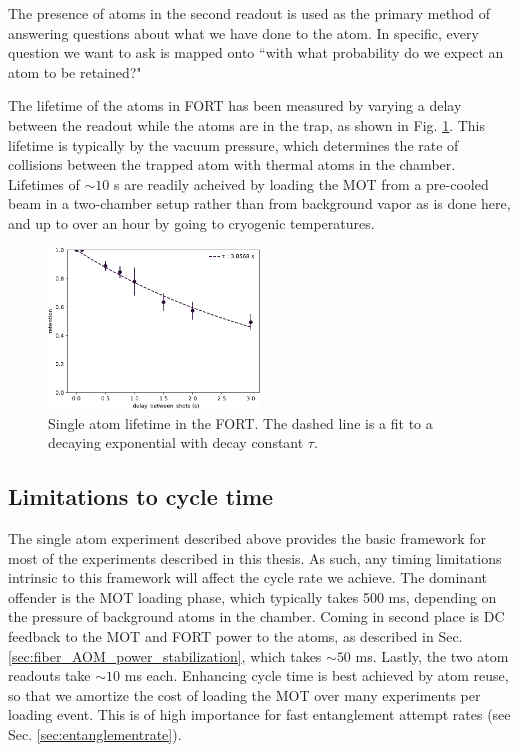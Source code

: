 The presence of atoms in the second readout is used as the primary method of answering questions about what we have done to the atom. In specific, every question we want to ask is mapped onto ``with what probability do we expect an atom to be retained?"

The lifetime of the atoms in FORT has been measured by varying a delay between the readout while the atoms are in the trap, as shown in Fig. \ref{fig:atom_lifetime}. This lifetime is typically by the vacuum pressure, which determines the rate of collisions between the trapped atom with thermal atoms in the chamber. Lifetimes of $\sim10$ s are readily acheived by loading the MOT from a pre-cooled beam in a two-chamber setup\cite{Graham2022} rather than from background vapor as is done here, and up to over an hour by going to cryogenic temperatures\cite{Schymik2021}.
\begin{figure}[!ht]
    \centering
    \includegraphics[width=0.5\textwidth]{Images/trap_lifetime_experiment 17951.pdf}
    \caption{Single atom lifetime in the FORT. The dashed line is a fit to a decaying exponential with decay constant $\tau$.}
    \label{fig:atom_lifetime}
\end{figure}

\subsection{Limitations to cycle time}
The single atom experiment described above provides the basic framework for most of the experiments described in this thesis. As such, any timing limitations intrinsic to this framework will affect the cycle rate we achieve. The dominant offender is the MOT loading phase, which typically takes 500 ms, depending on the pressure of background atoms in the chamber. Coming in second place is DC feedback to the MOT and FORT power to the atoms, as described in Sec. \ref{sec:fiber_AOM_power_stabilization}, which takes $\sim50$ ms. Lastly, the two atom readouts take $\sim10$ ms each. Enhancing cycle time is best achieved by atom reuse, so that we amortize the cost of loading the MOT over many experiments per loading event. This is of high importance for fast entanglement attempt rates (see Sec. \ref{sec:entanglementrate}).

